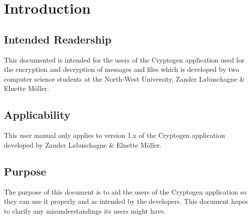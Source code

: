 \documentclass[11pt]{article}
\begin{document}
	

    \renewcommand{\cftsecleader}{\cftdotfill{\cftdotsep}} %
    \tableofcontents
    \thispagestyle{empty}
    \clearpage


    \setcounter{page}{1}

	\section{Introduction}
	\subsection{Intended Readership}
	This documented is intended for the users of the Cryptogen application used for the encryption and decryption of messages and files which is developed by two computer science students at the North-West University, Zander Labuschagne \& Elnette M\"{o}ller.

	\subsection{Applicability}
	This user manual only applies to version 1.x of the Cryptogen application developed by Zander Labuschagne \& Elnette M\"{o}ller.

	\subsection{Purpose}
	The purpose of this document is to aid the users of the Cryptogen application so they can use it properly and as intended by the developers. This document hopes to clarify any misunderstandings its users might have.
\end{document}
